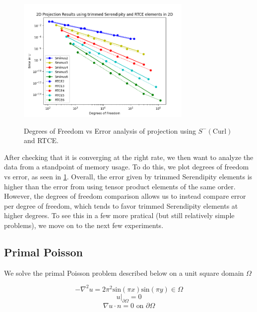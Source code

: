 \documentclass[manuscript,screen]{acmart}
\begin{document}
  \begin{figure}[h!]
    \caption{Degrees of Freedom vs Error analysis of projection using $S^-(\text{Curl})$ and RTCE.}
    \includegraphics[width=0.75\textwidth]{2dProjection.png}
    \label{fig:2dProjection}
  \end{figure}
  
  \noindent After checking that it is converging at the right rate, we then want to analyze the data from a standpoint of memory usage.  To do this, we plot degrees of freedom vs error, as seen in \ref{fig:2dProjection}.  Overall, the error given by trimmed Serendipity elements is higher than the error from using tensor product elements of the same order.  However, the degrees of freedom comparison allows us to instead compare error per degree of freedom, which tends to favor trimmed Serendipity elements at higher degrees.  To see this in a few more pratical (but still relatively simple problems), we move on to the next few experiments.
  



  \subsection{Primal Poisson}
  
\noindent We solve the primal Poisson problem described below on a unit square domain $\Omega$

\begin{equation}
    -\nabla^2 u = 2\pi^2\text{sin}(\pi x)\text{sin}(\pi y) \in \Omega
\end{equation}
\begin{equation*}
    u\vert_{\partial \Omega} = 0
\end{equation*}
\begin{equation*}
   \nabla u \cdot n = 0 \text{ on } \partial \Omega
\end{equation*}
\end{document}

